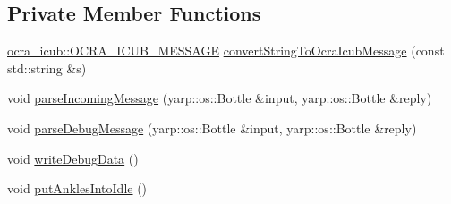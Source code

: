 \subsection*{Private Member Functions}
\begin{DoxyCompactItemize}
\item 
\hyperlink{namespaceocra__icub_afbd2db66b68005fb7cfac19210caf83f}{ocra\+\_\+icub\+::\+O\+C\+R\+A\+\_\+\+I\+C\+U\+B\+\_\+\+M\+E\+S\+S\+A\+GE} \hyperlink{classThread_a2c64d83df66f7168d34993b76a179dde}{convert\+String\+To\+Ocra\+Icub\+Message} (const std\+::string \&s)
\item 
void \hyperlink{classThread_ae21029d250ac7c720f2411eab71a9414}{parse\+Incoming\+Message} (yarp\+::os\+::\+Bottle \&input, yarp\+::os\+::\+Bottle \&reply)
\item 
void \hyperlink{classThread_a6ce5ef9684cb2793be85e7402ad672f0}{parse\+Debug\+Message} (yarp\+::os\+::\+Bottle \&input, yarp\+::os\+::\+Bottle \&reply)
\item 
void \hyperlink{classThread_a9af0e98aa9b1de2f5c7bfa2f6e5001a2}{write\+Debug\+Data} ()
\item 
void \hyperlink{classThread_a49b65da88eb521ff53ef94d6ec8da7ab}{put\+Ankles\+Into\+Idle} ()
\end{DoxyCompactItemize}
